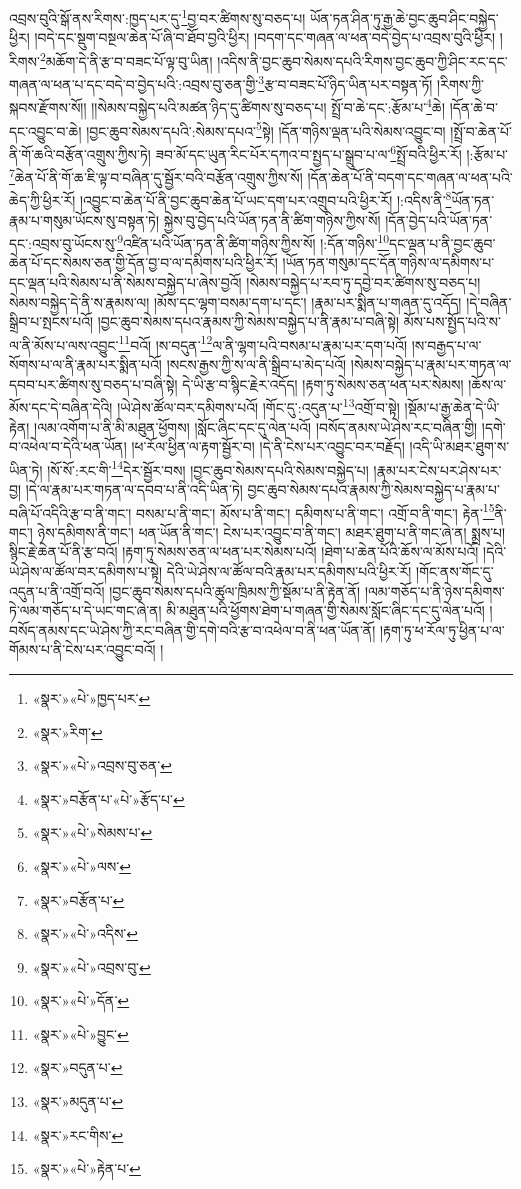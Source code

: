 འབྲས་བུའི་སྒོ་ནས་རིགས་:ཁྱད་པར་དུ་\footnote{«སྣར་»«པེ་»ཁྱད་པར་}བྱ་བར་ཚིགས་སུ་བཅད་པ། ཡོན་ཏན་ཤིན་ཏུ་རྒྱ་ཆེ་བྱང་ཆུབ་ཤིང་བསྐྱེད་ཕྱིར། །བདེ་དང་སྡུག་བསྔལ་ཆེན་པོ་ཞི་བ་ཐོབ་བྱའི་ཕྱིར། །བདག་དང་གཞན་ལ་ཕན་བདེ་བྱེད་པ་འབྲས་བུའི་ཕྱིར། །རིགས་\footnote{«སྣར་»རིག་}མཆོག་དེ་ནི་རྩ་བ་བཟང་པོ་ལྟ་བུ་ཡིན། །འདིས་ནི་བྱང་ཆུབ་སེམས་དཔའི་རིགས་བྱང་ཆུབ་ཀྱི་ཤིང་རང་དང་གཞན་ལ་ཕན་པ་དང་བདེ་བ་བྱེད་པའི་:འབྲས་བུ་ཅན་གྱི་\footnote{«སྣར་»«པེ་»འབྲས་བུ་ཅན་}རྩ་བ་བཟང་པོ་ཉིད་ཡིན་པར་བསྟན་ཏོ། །རིགས་ཀྱི་སྐབས་རྫོགས་སོ།། །།སེམས་བསྐྱེད་པའི་མཚན་ཉིད་དུ་ཚིགས་སུ་བཅད་པ། སྤྲོ་བ་ཆེ་དང་:རྩོམ་པ་\footnote{«སྣར་»བརྩོན་པ་«པེ་»རྩོད་པ་}ཆེ། །དོན་ཆེ་བ་དང་འབྱུང་བ་ཆེ། །བྱང་ཆུབ་སེམས་དཔའི་:སེམས་དཔའ་\footnote{«སྣར་»«པེ་»སེམས་པ་}སྟེ། །དོན་གཉིས་ལྡན་པའི་སེམས་འབྱུང་བ། །སྤྲོ་བ་ཆེན་པོ་ནི་གོ་ཆའི་བརྩོན་འགྲུས་ཀྱིས་ཏེ། ཟབ་མོ་དང་ཡུན་རིང་པོར་དཀའ་བ་སྤྱད་པ་སྒྲུབ་པ་ལ་\footnote{«སྣར་»«པེ་»ལས་}སྤྲོ་བའི་ཕྱིར་རོ། །:རྩོམ་པ་\footnote{«སྣར་»བརྩོན་པ་}ཆེན་པོ་ནི་གོ་ཆ་ཇི་ལྟ་བ་བཞིན་དུ་སྦྱོར་བའི་བརྩོན་འགྲུས་ཀྱིས་སོ། །དོན་ཆེན་པོ་ནི་བདག་དང་གཞན་ལ་ཕན་པའི་ཆེད་ཀྱི་ཕྱིར་རོ། །འབྱུང་བ་ཆེན་པོ་ནི་བྱང་ཆུབ་ཆེན་པོ་ཡང་དག་པར་འགྲུབ་པའི་ཕྱིར་རོ། །:འདིས་ནི་\footnote{«སྣར་»«པེ་»འདིས་}ཡོན་ཏན་རྣམ་པ་གསུམ་ཡོངས་སུ་བསྟན་ཏེ། སྐྱེས་བུ་བྱེད་པའི་ཡོན་ཏན་ནི་ཚིག་གཉིས་ཀྱིས་སོ། །དོན་བྱེད་པའི་ཡོན་ཏན་དང་:འབྲས་བུ་ཡོངས་སུ་\footnote{«སྣར་»«པེ་»འབྲས་བུ་}འཛིན་པའི་ཡོན་ཏན་ནི་ཚིག་གཉིས་ཀྱིས་སོ། །:དོན་གཉིས་\footnote{«སྣར་»«པེ་»དོན་}དང་ལྡན་པ་ནི་བྱང་ཆུབ་ཆེན་པོ་དང་སེམས་ཅན་གྱི་དོན་བྱ་བ་ལ་དམིགས་པའི་ཕྱིར་རོ། །ཡོན་ཏན་གསུམ་དང་དོན་གཉིས་ལ་དམིགས་པ་དང་ལྡན་པའི་སེམས་པ་ནི་སེམས་བསྐྱེད་པ་ཞེས་བྱའོ། །སེམས་བསྐྱེད་པ་རབ་ཏུ་དབྱེ་བར་ཚིགས་སུ་བཅད་པ། སེམས་བསྐྱེད་དེ་ནི་ས་རྣམས་ལ། །མོས་དང་ལྷག་བསམ་དག་པ་དང་། །རྣམ་པར་སྨིན་པ་གཞན་དུ་འདོད། །དེ་བཞིན་སྒྲིབ་པ་སྤངས་པའོ། །བྱང་ཆུབ་སེམས་དཔའ་རྣམས་ཀྱི་སེམས་བསྐྱེད་པ་ནི་རྣམ་པ་བཞི་སྟེ། མོས་པས་སྤྱོད་པའི་ས་ལ་ནི་མོས་པ་ལས་འབྱུང་\footnote{«སྣར་»«པེ་»བྱུང་}བའོ། །ས་བདུན་\footnote{«སྣར་»བདུན་པ་}ལ་ནི་ལྷག་པའི་བསམ་པ་རྣམ་པར་དག་པའོ། །ས་བརྒྱད་པ་ལ་སོགས་པ་ལ་ནི་རྣམ་པར་སྨིན་པའོ། །སངས་རྒྱས་ཀྱི་ས་ལ་ནི་སྒྲིབ་པ་མེད་པའོ། །སེམས་བསྐྱེད་པ་རྣམ་པར་གཏན་ལ་དབབ་པར་ཚིགས་སུ་བཅད་པ་བཞི་སྟེ། དེ་ཡི་རྩ་བ་སྙིང་རྗེར་འདོད། །རྟག་ཏུ་སེམས་ཅན་ཕན་པར་སེམས། །ཆོས་ལ་མོས་དང་དེ་བཞིན་དེའི། །ཡེ་ཤེས་ཚོལ་བར་དམིགས་པའོ། །གོང་དུ་:འདུན་པ་\footnote{«སྣར་»མདུན་པ་}འགྲོ་བ་སྟེ། །སྡོམ་པ་རྒྱ་ཆེན་དེ་ཡི་རྟེན། །ལམ་འགོག་པ་ནི་མི་མཐུན་ཕྱོགས། །སློང་ཞིང་དང་དུ་ལེན་པའོ། །བསོད་ནམས་ཡེ་ཤེས་རང་བཞིན་གྱི། །དགེ་བ་འཕེལ་བ་དེའི་ཕན་ཡོན། །ཕ་རོལ་ཕྱིན་ལ་རྟག་སྦྱོར་བ། །དེ་ནི་ངེས་པར་འབྱུང་བར་བརྗོད། །འདི་ཡི་མཐར་ཐུག་ས་ཡིན་ཏེ། །སོ་སོ་:རང་གི་\footnote{«སྣར་»རང་གིས་}དེར་སྦྱོར་བས། །བྱང་ཆུབ་སེམས་དཔའི་སེམས་བསྐྱེད་པ། །རྣམ་པར་ངེས་པར་ཤེས་པར་བྱ། །དེ་ལ་རྣམ་པར་གཏན་ལ་དབབ་པ་ནི་འདི་ཡིན་ཏེ། བྱང་ཆུབ་སེམས་དཔའ་རྣམས་ཀྱི་སེམས་བསྐྱེད་པ་རྣམ་པ་བཞི་པོ་འདིའི་རྩ་བ་ནི་གང་། བསམ་པ་ནི་གང་། མོས་པ་ནི་གང་། དམིགས་པ་ནི་གང་། འགྲོ་བ་ནི་གང་། རྟེན་\footnote{«སྣར་»«པེ་»རྟེན་པ་}ནི་གང་། ཉེས་དམིགས་ནི་གང་། ཕན་ཡོན་ནི་གང་། ངེས་པར་འབྱུང་བ་ནི་གང་། མཐར་ཐུག་པ་ནི་གང་ཞེ་ན། སྨྲས་པ། སྙིང་རྗེ་ཆེན་པོ་ནི་རྩ་བའོ། །རྟག་ཏུ་སེམས་ཅན་ལ་ཕན་པར་སེམས་པའོ། །ཐེག་པ་ཆེན་པོའི་ཆོས་ལ་མོས་པའོ། །དེའི་ཡེ་ཤེས་ལ་ཚོལ་བར་དམིགས་པ་སྟེ། དེའི་ཡེ་ཤེས་ལ་ཚོལ་བའི་རྣམ་པར་དམིགས་པའི་ཕྱིར་རོ། །གོང་ནས་གོང་དུ་འདུན་པ་ནི་འགྲོ་བའོ། །བྱང་ཆུབ་སེམས་དཔའི་ཚུལ་ཁྲིམས་ཀྱི་སྡོམ་པ་ནི་རྟེན་ནོ། །ལམ་གཅོད་པ་ནི་ཉེས་དམིགས་ཏེ་ལམ་གཅོད་པ་དེ་ཡང་གང་ཞེ་ན། མི་མཐུན་པའི་ཕྱོགས་ཐེག་པ་གཞན་གྱི་སེམས་སློང་ཞིང་དང་དུ་ལེན་པའོ། །བསོད་ནམས་དང་ཡེ་ཤེས་ཀྱི་རང་བཞིན་གྱི་དགེ་བའི་རྩ་བ་འཕེལ་བ་ནི་ཕན་ཡོན་ནོ། །རྟག་ཏུ་ཕ་རོལ་ཏུ་ཕྱིན་པ་ལ་གོམས་པ་ནི་ངེས་པར་འབྱུང་བའོ། །
